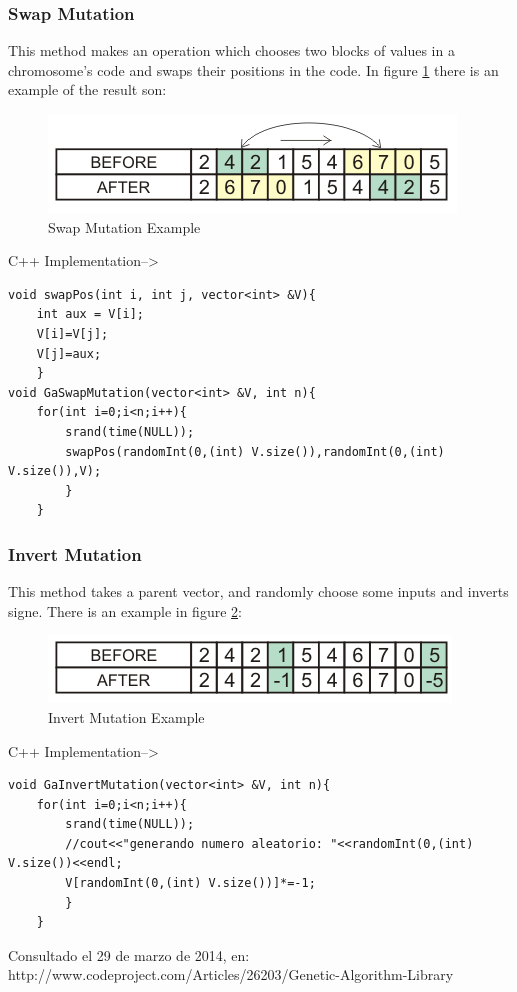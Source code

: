 \documentclass[letterpaper]{article}
\begin{document}
\subsubsection{Swap Mutation}

This method makes an operation which chooses two blocks of values in a chromosome's code and swaps their positions in the code. In figure \ref{F:swap} there is an example of the result son:

\begin{figure}[h]
\centering
\includegraphics[width=0.7\linewidth]{images/swap.png}
\caption{Swap Mutation Example}
\label{F:swap}
\end{figure}


\bigskip
\bigskip
C++ Implementation-->
\bigskip
\bigskip

\lstset{language=C++}
\begin{lstlisting}
void swapPos(int i, int j, vector<int> &V){
	int aux = V[i];
	V[i]=V[j];
	V[j]=aux;
	}
void GaSwapMutation(vector<int> &V, int n){
	for(int i=0;i<n;i++){
		srand(time(NULL));
		swapPos(randomInt(0,(int) V.size()),randomInt(0,(int) V.size()),V);
		}
	}
\end{lstlisting}


\subsubsection{Invert Mutation}

This method takes a parent vector, and randomly choose some inputs and inverts signe. There is an example in figure \ref{F:invert}:

\begin{figure}[h]
\centering
\includegraphics[width=0.7\linewidth]{images/invert.png}
\caption{Invert Mutation Example}
\label{F:invert}
\end{figure}

\bigskip
\bigskip
C++ Implementation-->
\bigskip
\bigskip


\lstset{language=C++}
\begin{lstlisting}
void GaInvertMutation(vector<int> &V, int n){
	for(int i=0;i<n;i++){
		srand(time(NULL));
		//cout<<"generando numero aleatorio: "<<randomInt(0,(int) V.size())<<endl;
		V[randomInt(0,(int) V.size())]*=-1;
		}
	}
\end{lstlisting}



\begin{thebibliography}{99}

Consultado el 29 de marzo de 2014, en: http://www.codeproject.com/Articles/26203/Genetic-Algorithm-Library

\end{thebibliography}
\end{document}
